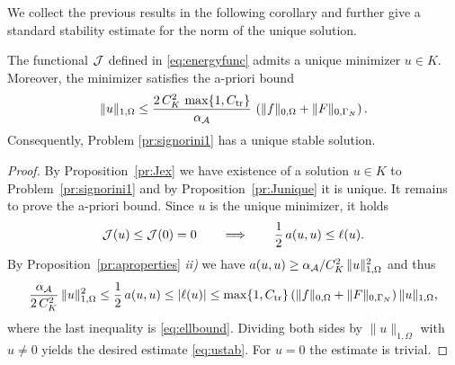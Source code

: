 We collect the previous results in the following corollary and further give a standard stability estimate for the norm of the unique solution.
\begin{corollary}\label{cor:wellposed}
	The functional ${\mathcal J}$ defined in \eqref{eq:energyfunc} admits a unique minimizer $u\in K$. Moreover, the minimizer satisfies the a-priori bound
	\begin{equation}\label{eq:ustab}
		\|u\|_{1,\Omega} \le \frac{2\,C_K^2\,\max\{1,C_\mathrm{tr}\}}{\alpha_{\mathcal A}}\,\left(\|f\|_{0,\Omega} +\|F\|_{0,\Gamma_N}\right).
	\end{equation}
	Consequently, Problem \ref{pr:signorini1} has a unique stable solution.
\end{corollary}
\begin{proof}
	By Proposition~\ref{pr:Jex} we have existence of a solution $u\in K$ to Problem~\ref{pr:signorini1} and by Proposition~\ref{pr:Junique} it is unique. It remains to prove the a-priori bound. Since $u$ is the unique minimizer, it holds
	\begin{equation*}
		{\mathcal J}(u)\le {\mathcal J}(0)=0\qquad\Longrightarrow\qquad \frac{1}{2}\,a(u,u)\le \ell(u).
	\end{equation*}
	By Proposition~\ref{pr:aproperties} {\em ii)} we have $a(u,u)\ge \alpha_{\mathcal A} / C_K^2\,\|u\|_{1,\Omega}^2$ and thus
	\begin{equation*}
		\frac{\alpha_{\mathcal A}}{2\,C_K^2}\,\|u\|_{1,\Omega}^2\le \frac{1}{2}\,a(u,u)\le |\ell(u)|\le  \max\{1,C_{\mathrm{tr}}\}\left(\|f\|_{0,\Omega} +\|F\|_{0,\Gamma_N}\right)\|u\|_{1,\Omega},
	\end{equation*}
	where the last inequality is \eqref{eq:ellbound}. Dividing both sides by $\|u\|_{1,\Omega}$ with $u\neq 0$ yields the desired estimate \eqref{eq:ustab}. For $u=0$ the estimate is trivial.
\end{proof}